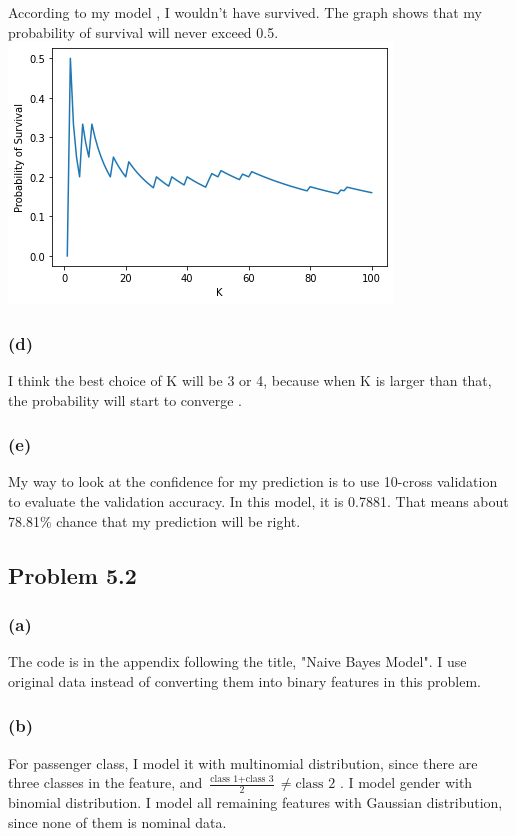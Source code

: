 \documentclass{article}
\begin{document}
	According to my model , I wouldn't have survived. The graph shows that my probability of survival will never exceed 0.5.\\
	
	\includegraphics[scale=0.5]{1_c}
	
\subsubsection*{(d)}
	I think the best choice of K will be 3 or 4, because when K is larger than that, the probability will start to converge .
	
\subsubsection*{(e)}
	My way to look at the confidence for my prediction is to use 10-cross validation to evaluate the validation accuracy. In this model, it is 0.7881. That means about 78.81\% chance that my prediction will be right.



\subsection*{Problem 5.2}
\subsubsection*{(a)}
	The code is in the appendix following the title, "Naive Bayes Model".	I use original data instead of converting them into binary features in this problem.
\subsubsection*{(b)}
	For passenger class, I model it with multinomial distribution, since there are three classes in the feature, and $\frac{\text{class 1} + \text{class 3}}{2} \neq \text{class 2}$ . I model gender with binomial distribution. I model all remaining features with Gaussian distribution, since none of them is nominal data.
\end{document}
